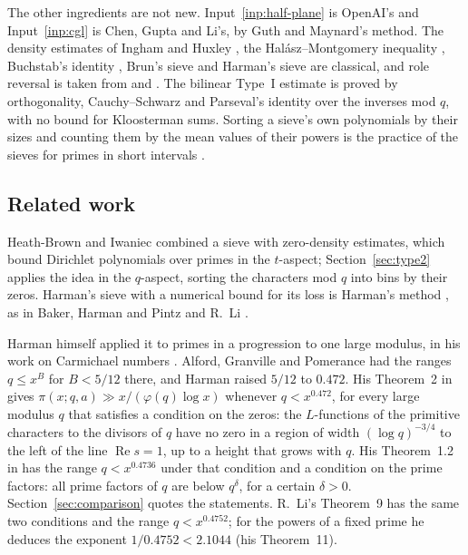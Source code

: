 \documentclass[11pt]{article}
\theoremstyle{definition}
\begin{document}
The other ingredients are not new. Input~\ref{inp:half-plane} is OpenAI's and Input~\ref{inp:cgl} is Chen, Gupta and
Li's, by Guth and Maynard's method. The density estimates of Ingham \cite{ingham} and Huxley \cite{huxley72,
huxley75}, the Hal\'asz--Montgomery inequality \cite{halasz, montgomery69}, Buchstab's identity \cite{buchstab},
Brun's sieve \cite{brun} and Harman's sieve are classical, and role reversal is taken from \cite{bhp} and
\cite{harman}. The bilinear Type~I estimate is proved by orthogonality, Cauchy--Schwarz and Parseval's identity
over the inverses mod $q$, with no bound for Kloosterman sums. Sorting a sieve's own polynomials by their sizes and
counting them by the mean values of their powers is the practice of the sieves for primes in short intervals
\cite{hb-iwaniec, bhp, harman}.

\subsection*{Related work}

Heath-Brown and Iwaniec \cite{hb-iwaniec} combined a sieve with zero-density estimates, which bound Dirichlet
polynomials over primes in the $t$-aspect; Section~\ref{sec:type2} applies the idea in the $q$-aspect, sorting the
characters mod $q$ into bins by their zeros. Harman's sieve with a numerical bound for its loss is Harman's method
\cite{harman}, as in Baker, Harman and Pintz \cite{bhp} and R.~Li \cite{li-harman}.

Harman himself applied it to primes in a progression to one large modulus, in his work on Carmichael numbers
\cite{harman05, harman08}. Alford, Granville and Pomerance \cite{agp} had the ranges $q \le x^B$ for $B < 5/12$
there, and Harman raised $5/12$ to $0.472$. His Theorem~2 in \cite{harman05} gives
$\pi(x; q, a) \gg x/(\varphi(q) \log x)$ whenever $q < x^{0.472}$, for every large modulus $q$ that satisfies a
condition on the zeros: the $L$-functions of the primitive characters to the divisors of $q$ have no zero in a region
of width $(\log q)^{-3/4}$ to the left of the line $\operatorname{Re} s = 1$, up to a height that grows with $q$. His
Theorem~1.2 in \cite{harman08} has the range $q < x^{0.4736}$ under that condition and a condition on the prime
factors: all prime factors of $q$ are below $q^\delta$, for a certain $\delta > 0$. Section~\ref{sec:comparison}
quotes the statements. R.~Li's Theorem~9 \cite{li-harman} has the same two conditions and the range
$q < x^{0.4752}$; for the powers of a fixed prime he deduces the exponent $1/0.4752 < 2.1044$ (his Theorem~11).
\end{document}
